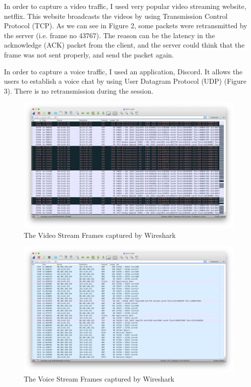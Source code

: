 \documentclass[11pt]{article}
\begin{document}
	In order to capture a video traffic, I used very popular video streaming website, netflix. This website broadcasts the videos by using Transmission Control Protocol (TCP). As we can see in Figure 2, some packets were retransmitted by the server (i.e. frame no 43767). The reason can be the latency in the acknowledge (ACK) packet from the client, and the server could think that the frame was not sent properly, and send the packet again. 
	
	In order to capture a voice traffic, I used an application, Discord. It allows the users to establish a voice chat by using User Datagram Protocol (UDP) (Figure 3). There is no retransmission during the session. 
	
	\begin{figure}[H]
		\centering
		\includegraphics[width=1\linewidth]{video_stream}
		\caption{The Video Stream Frames captured by Wireshark}
	\end{figure}

	\begin{figure}[H]
		\centering
		\includegraphics[width=1\linewidth]{voice_stream}
		\caption{The Voice Stream Frames captured by Wireshark}
	\end{figure}
	
\end{document}
